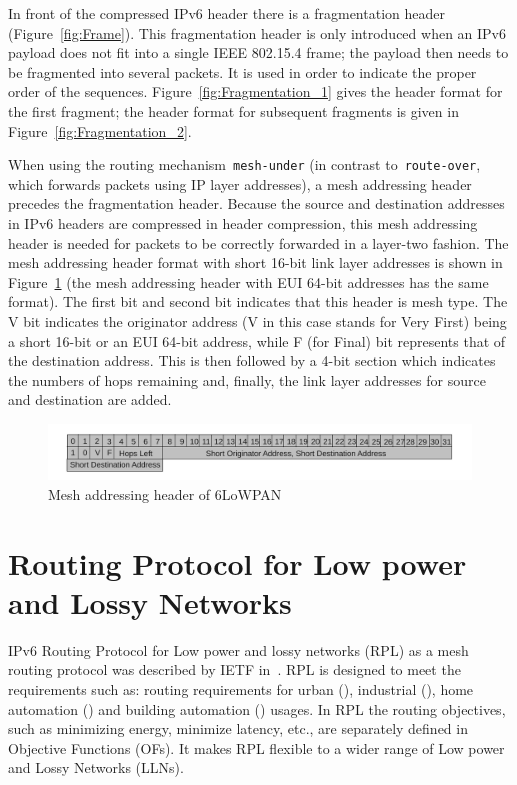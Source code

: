 In front of the compressed IPv6 header there is a fragmentation header (Figure~\ref{fig:Frame})\@. This fragmentation header is only introduced when an IPv6 payload does not fit into a single IEEE 802.15.4 frame;
the payload then needs to be fragmented into several packets. It is used in order to indicate the proper order of the sequences. Figure~\ref{fig:Fragmentation_1} gives the header format for the first
fragment; the header format for subsequent fragments is given in Figure~\ref{fig:Fragmentation_2}.
\newline

When using the routing mechanism~\texttt{mesh-under} (in contrast to~\texttt{route-over}, which forwards packets using IP layer addresses)\@, a mesh addressing header precedes the fragmentation header. Because the source and destination addresses in IPv6 headers are compressed in header compression, this mesh addressing header is needed for packets to be correctly forwarded in a layer-two fashion. The mesh addressing header format with short 16-bit link layer addresses is shown in Figure~\ref{fig:Mesh} (the mesh addressing header with EUI 64-bit addresses has the same format)\@. The first bit and second bit indicates that this header is mesh type. The V bit indicates the originator address (V in this case stands for Very First) being a short 16-bit or an EUI 64-bit address, while F (for Final) bit represents that of the destination address.  This is then followed by a 4-bit section which indicates the numbers of hops remaining and, finally, the link layer addresses for source and destination are added.
\begin{figure}[htbp]
  \begin{center}
    \leavevmode
      \includegraphics[scale=0.8]{Pics/Mesh.pdf}%
    \caption{Mesh addressing header of 6LoWPAN}
    \label{fig:Mesh}
  \end{center}
\end{figure}

\section{Routing Protocol for Low power and Lossy Networks}
\label{RPL}
IPv6 Routing Protocol for Low power and lossy networks (RPL) as a mesh routing protocol was described by IETF in~\cite{draft-ietf-roll-rpl-19}. RPL is designed to meet the requirements such as: routing requirements for urban (\cite{RFC 5548})\@, industrial (\cite{RFC 5673})\@, home automation (\cite{RFC 5826}) and building automation (\cite{RFC 5867}) usages\@. In RPL the routing objectives, such as minimizing energy, minimize latency, etc., are separately defined in Objective Functions (OFs)\@. It makes RPL flexible to a wider range of Low power and Lossy Networks (LLNs)\@.

